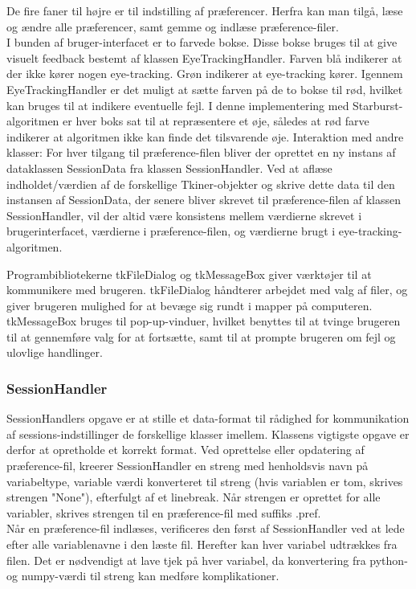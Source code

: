 \documentclass[rapport.tex]{subfiles}
\begin{document}
	De fire faner til højre er til indstilling af præferencer. Herfra kan man tilgå, læse og ændre alle præferencer, samt gemme og indlæse præference-filer.\\
	
	I bunden af bruger-interfacet er to farvede bokse. Disse bokse bruges til at give visuelt feedback bestemt af klassen EyeTrackingHandler. Farven blå indikerer at der ikke kører nogen eye-tracking. Grøn indikerer at eye-tracking kører. Igennem EyeTrackingHandler er det muligt at sætte farven på de to bokse til rød, hvilket kan bruges til at indikere eventuelle fejl. I denne implementering med Starburst-algoritmen er hver boks sat til at repræsentere et øje, således at rød farve indikerer at algoritmen ikke kan finde det tilsvarende øje. 
	Interaktion med andre klasser:
	For hver tilgang til præference-filen bliver der oprettet en ny instans af dataklassen SessionData fra klassen SessionHandler. Ved at aflæse indholdet/værdien af de forskellige Tkiner-objekter og skrive dette data til den instansen af SessionData, der senere bliver skrevet til præference-filen af klassen SessionHandler, vil der altid være konsistens mellem værdierne skrevet i brugerinterfacet, værdierne i præference-filen, og værdierne brugt i eye-tracking-algoritmen. 
	
	Programbibliotekerne tkFileDialog og tkMessageBox giver værktøjer til at kommunikere med brugeren. tkFileDialog håndterer arbejdet med valg af filer, og giver brugeren mulighed for at bevæge sig rundt i mapper på computeren. tkMessageBox bruges til pop-up-vinduer, hvilket benyttes til at tvinge brugeren til at gennemføre valg for at fortsætte, samt til at prompte brugeren om fejl og ulovlige handlinger. 
	
	
	\subsubsection{SessionHandler}
	SessionHandlers opgave er at stille et data-format til rådighed for kommunikation af sessions-indstillinger de forskellige klasser imellem. Klassens vigtigste opgave er derfor at opretholde et korrekt format. Ved oprettelse eller opdatering af præference-fil, kreerer SessionHandler en streng med henholdsvis navn på variabeltype, variable værdi konverteret til streng (hvis variablen er tom, skrives strengen "None"), efterfulgt af et linebreak. Når strengen er oprettet for alle variabler, skrives strengen til en præference-fil med suffiks .pref. \\
	Når en præference-fil indlæses, verificeres den først af SessionHandler ved at lede efter alle variablenavne i den læste fil. Herefter kan hver variabel udtrækkes fra filen. Det er nødvendigt at lave tjek på hver variabel, da konvertering fra python- og numpy-værdi til streng kan medføre komplikationer. 
	
\end{document}
